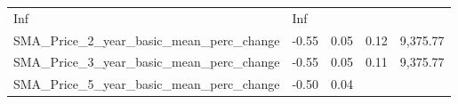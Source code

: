 \documentclass[]{article}
\begin{document}
\begin{longtable}[]{@{}lllll@{}}
\begin{minipage}[t]{0.09\columnwidth}
Inf\strut
\end{minipage} & \begin{minipage}[t]{0.11\columnwidth}\raggedright\strut
Inf\strut
\end{minipage}\tabularnewline
\begin{minipage}[t]{0.49\columnwidth}\raggedright\strut
SMA\_Price\_2\_year\_basic\_mean\_perc\_change\strut
\end{minipage} & \begin{minipage}[t]{0.08\columnwidth}\raggedright\strut
-0.55\strut
\end{minipage} & \begin{minipage}[t]{0.09\columnwidth}\raggedright\strut
0.05\strut
\end{minipage} & \begin{minipage}[t]{0.09\columnwidth}\raggedright\strut
0.12\strut
\end{minipage} & \begin{minipage}[t]{0.11\columnwidth}\raggedright\strut
9,375.77\strut
\end{minipage}\tabularnewline
\begin{minipage}[t]{0.49\columnwidth}\raggedright\strut
SMA\_Price\_3\_year\_basic\_mean\_perc\_change\strut
\end{minipage} & \begin{minipage}[t]{0.08\columnwidth}\raggedright\strut
-0.55\strut
\end{minipage} & \begin{minipage}[t]{0.09\columnwidth}\raggedright\strut
0.05\strut
\end{minipage} & \begin{minipage}[t]{0.09\columnwidth}\raggedright\strut
0.11\strut
\end{minipage} & \begin{minipage}[t]{0.11\columnwidth}\raggedright\strut
9,375.77\strut
\end{minipage}\tabularnewline
\begin{minipage}[t]{0.49\columnwidth}\raggedright\strut
SMA\_Price\_5\_year\_basic\_mean\_perc\_change\strut
\end{minipage} & \begin{minipage}[t]{0.08\columnwidth}\raggedright\strut
-0.50\strut
\end{minipage} & \begin{minipage}[t]{0.09\columnwidth}\raggedright\strut
0.04\strut
\end{minipage} & \begin{minipage}[t]{0.09\columnwidth}\raggedright\strut

\end{minipage}
\end{longtable}
\end{document}
